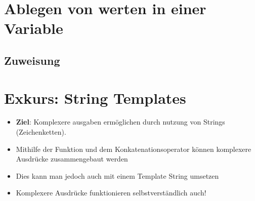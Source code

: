
\section{Ablegen von werten in einer Variable}
\subsection{Zuweisung}
\livecoding

\section{Exkurs: String Templates}
\begin{frame}
    \slidehead

    \begin{itemize}[<+->]
        \item \textbf{Ziel}: Komplexere ausgaben ermöglichen durch nutzung von Strings (Zeichenketten).
        \item Mithilfe der Funktion  und dem Konkatenationsoperator \pythoninline{+} können komplexere Ausdrücke zusammengebaut werden
        \item Dies kann man jedoch auch mit einem Template String umsetzen
    \end{itemize}
\end{frame}

\begin{frame}
    \slidehead

    \begin{itemize}[<+->]
        \item Komplexere Ausdrücke funktionieren selbstverständlich auch!
    \end{itemize}
\end{frame}

